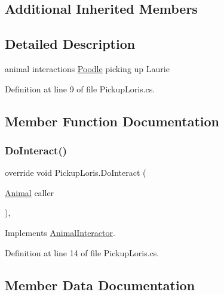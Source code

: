 \subsection*{Additional Inherited Members}


\subsection{Detailed Description}
animal interactions \mbox{\hyperlink{class_poodle}{Poodle}} picking up Laurie 



Definition at line 9 of file Pickup\+Loris.\+cs.



\subsection{Member Function Documentation}
\mbox{\label{class_pickup_loris_ab6d5a9254471e0936b93d0b3a0cbd69c}} 
\subsubsection{\texorpdfstring{Do\+Interact()}{DoInteract()}}
{\footnotesize\ttfamily override void Pickup\+Loris.\+Do\+Interact (\begin{DoxyParamCaption}\item[{\mbox{\hyperlink{class_animal}{Animal}}}]{caller }\end{DoxyParamCaption})\hspace{0.3cm}{\ttfamily [protected]}, {\ttfamily [virtual]}}



Implements \mbox{\hyperlink{class_animal_interactor_a522811ab410a5acbc12362e29263c5a8}{Animal\+Interactor}}.



Definition at line 14 of file Pickup\+Loris.\+cs.



\subsection{Member Data Documentation}
\mbox{\label{class_pickup_loris_a1052fd931394a6ccd682bcd7adc999c6}} 
